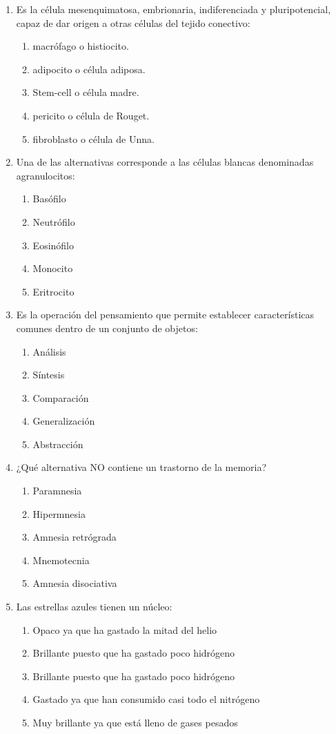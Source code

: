\begin{enumerate}
	\item Es la célula mesenquimatosa, embrionaria, indiferenciada y pluripotencial, capaz de dar origen a otras células del tejido conectivo:
	\begin{enumerate}[label=\alph*)]
		\item macrófago o histiocito.
		\item adipocito o célula adiposa.
		\item Stem-cell o célula madre.
		\item pericito o célula de Rouget.
		\item fibroblasto o célula de Unna.
	\end{enumerate}
	
	\item Una de las alternativas corresponde a las células blancas denominadas agranulocitos:
	\begin{enumerate}[label=\alph*)]
		\item Basófilo
		\item Neutrófilo
		\item Eosinófilo
		\item Monocito
		\item Eritrocito
	\end{enumerate}
	
	\item Es la operación del pensamiento que permite establecer características comunes dentro de un conjunto de objetos:
	\begin{enumerate}[label=\alph*)]
		\item Análisis
		\item Síntesis
		\item Comparación
		\item Generalización
		\item Abstracción
	\end{enumerate}
	
	\item ¿Qué alternativa NO contiene un trastorno de la memoria?
	\begin{enumerate}[label=\alph*)]
		\item Paramnesia
		\item Hipermnesia
		\item Amnesia retrógrada
		\item Mnemotecnia
		\item Amnesia disociativa
	\end{enumerate}
	
	\item Las estrellas azules tienen un núcleo:
	\begin{enumerate}[label=\alph*)]
		\item Opaco ya que ha gastado la mitad del helio
		\item Brillante puesto que ha gastado poco hidrógeno
		\item Brillante puesto que ha gastado poco hidrógeno
		\item Gastado ya que han consumido casi todo el nitrógeno
		\item Muy brillante ya que está lleno de gases pesados
	\end{enumerate}
	

\end{enumerate}
